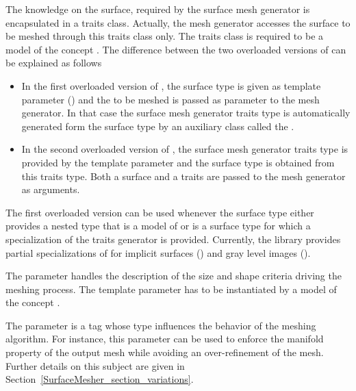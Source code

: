 The knowledge on the surface, required by the surface mesh generator
is  encapsulated in a
traits class. Actually, the mesh generator accesses the surface to be meshed
through this traits class only. 
The traits class is required to be a model
of the concept . 
The difference between the two overloaded versions of
can be explained as follows
\begin{itemize}
\item
In the first  overloaded version
of ,  the surface type  is given  
as template parameter  () and the 
to be meshed is passed as parameter to the mesh generator.
In that case the surface mesh generator traits type 
is  automatically generated form the surface type
by an auxiliary class called  the .
\item In the second overloaded version of , 
the surface mesh generator traits type is provided
by the  template parameter 
and the surface type is obtained from this traits type.
Both  a surface and a traits 
are passed to the mesh generator as arguments. 
\end{itemize}


The first overloaded version can be used
whenever the surface type either provides  a nested type
that is  a model of 
or is a surface type for which a specialization
of the traits generator 
is provided.
Currently, the library provides partial specializations
of  
for implicit surfaces () and 
gray level images ().



The parameter  handles the description of the size and shape
criteria driving the meshing process. The template parameter 
has to be instantiated by a model of the concept .


The parameter   is a tag 
whose type influences the behavior of the
meshing algorithm. For instance, this parameter
can be used to enforce the manifold property
of the output mesh while avoiding 
an over-refinement of the mesh. Further details on this
subject are given in 
Section~\ref{SurfaceMesher_section_variations}.


